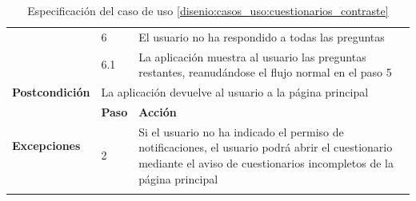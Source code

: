 \begin{table}[h]
\begin{tabularx}{\textwidth}{|l|l|X|}
                    \cline{2-3} & 6 & El usuario no ha respondido a todas las preguntas \\
                    \cline{2-3} & 6.1 & La aplicación muestra al usuario las preguntas restantes, reanudándose el flujo normal en el paso 5 \\
                    \hline
                    \textbf{Postcondición} & \multicolumn{2}{|X|}{La aplicación devuelve al usuario a la página principal} \\
                    \hline
                    \multirow{2}{*}{\textbf{Excepciones}}  & \textbf{Paso} & \textbf{Acción} \\
                    \cline{2-3} & 2 & Si el usuario no ha indicado el permiso de notificaciones, el usuario podrá abrir el cuestionario mediante el aviso de cuestionarios incompletos de la página principal \\
                    \hline
                    \caption{Especificación del caso de uso \ref{disenio:casos_uso:cuestionarios_contraste}}
                    \label{tabla:casos_uso:cuestionarios_contraste}
                \end{tabularx}
            \end{table}


